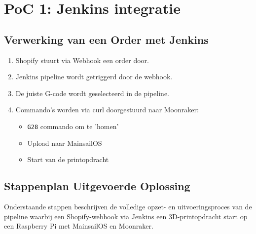 \section{PoC 1: Jenkins integratie}
\subsection{Verwerking van een Order met Jenkins}
\begin{enumerate}
    \item Shopify stuurt via Webhook een order door.
    \item Jenkins pipeline wordt getriggerd door de webhook.
    \item De juiste G-code wordt geselecteerd in de pipeline.
    \item Commando’s worden via curl doorgestuurd naar Moonraker:
    \begin{itemize}
        \item \texttt{G28} commando om te 'homen'
        \item Upload naar MainsailOS
        \item Start van de printopdracht
    \end{itemize}
\end{enumerate}

\subsection{Stappenplan Uitgevoerde Oplossing}

Onderstaande stappen beschrijven de volledige opzet- en uitvoeringsproces van de pipeline waarbij een Shopify-webhook via Jenkins een 3D-printopdracht start op een Raspberry Pi met MainsailOS en Moonraker.

